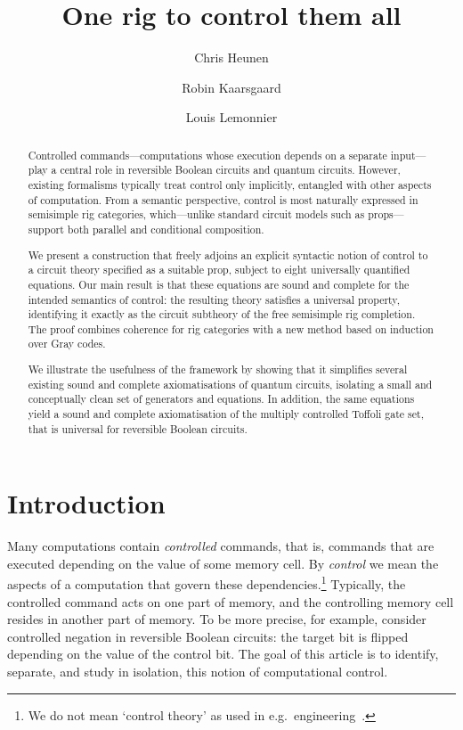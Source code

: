 \documentclass[a4paper]{article}
\title{One rig to control them all}
\author[1]{Chris Heunen}
\author[2]{Robin Kaarsgaard}
\author[1]{Louis Lemonnier}
\affil[1]{University of Edinburgh}
\affil[2]{University of Southern Denmark}
\date{}
\theoremstyle{plain}
\theoremstyle{definition}
\begin{document}
\maketitle

\begin{abstract}
	Controlled commands---computations whose execution depends on a separate
	input---play a central role in reversible Boolean circuits and quantum
	circuits. However, existing formalisms typically treat control only
	implicitly, entangled with other aspects of computation. From a semantic
	perspective, control is most naturally expressed in semisimple rig
	categories, which---unlike standard circuit models such as
	props---support both parallel and conditional composition.

	We present a construction that freely adjoins an explicit syntactic
	notion of control to a circuit theory specified as a suitable prop,
	subject to eight universally quantified equations. Our main result is
	that these equations are sound and complete for the intended semantics of
	control: the resulting theory satisfies a universal property, identifying
	it exactly as the circuit subtheory of the free semisimple rig
	completion. The proof combines coherence for rig categories with a new
	method based on induction over Gray codes.

	We illustrate the usefulness of the framework by showing that it
	simplifies several existing sound and complete axiomatisations of quantum
	circuits, isolating a small and conceptually clean set of generators and
	equations. In addition, the same equations yield a sound and complete
	axiomatisation of the multiply controlled Toffoli gate set, that is
	universal for reversible Boolean circuits.
\end{abstract}

\section{Introduction}

Many computations contain \emph{controlled} commands, that is, commands that are executed depending on the value of some memory cell.
By \emph{control} we mean the aspects of a computation that govern these dependencies.\footnote{We do not mean `control theory' as used in e.g.\ engineering~\cite{erbele:control}.}
Typically, the controlled command acts on one part of memory, and the controlling memory cell resides in another part of memory.
To be more precise, for example, consider controlled negation in reversible Boolean circuits: the target bit is flipped depending on the value of the control bit.
The goal of this article is to identify, separate, and study in isolation, this notion of computational control.
\end{document}
